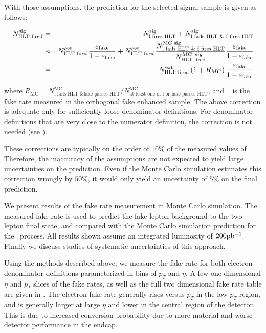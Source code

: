 \documentclass{cmspaper}
\begin{document}
With those assumptions, the prediction for the selected signal sample is given as follows:

\begin{eqnarray}
  N^{\textrm{sig}}_{\textrm{HLT fired}} & = & N^{\textrm{sig}}_{\textrm{l fires HLT}} + N^{\textrm{sig}}_{\textrm{l fails HLT \& f fires HLT}} \nonumber \\
  & \approx &  N^{\textrm{ext}}_{\textrm{HLT fired}} \frac{\varepsilon_{\mathrm{fake}}}{1-\varepsilon_{\mathrm{fake}}} +  N^{\textrm{ext}}_{\textrm{HLT fired}} \frac{N^{\textrm{MC\ sig}}_{\textrm{l fails HLT \& f fires HLT}}}{N^{MC\ sig}_{\textrm{HLT fired}}} \frac{\varepsilon_{\mathrm{fake}}}{1-\varepsilon_{\mathrm{fake}}} \nonumber \\
  & = &  N^{\textrm{ext}}_{\textrm{HLT fired}} \left(1+R_{MC}\right) \frac{\varepsilon_{\mathrm{fake}}}{1-\varepsilon_{\mathrm{fake}}} \nonumber \\
\end{eqnarray}

where $R_{\textrm{MC}} = N^{\textrm{MC}}_{\textrm{l fails HLT \& fake passes HLT}} / N^{\textrm{MC}}_{\textrm{at least one of l or fake passes HLT}}$, and \epsilonFake~ is the fake rate measured in the orthogonal fake enhanced sample. The above correction is adequate only for sufficiently loose denominator definitions. For denominator definitions that are very close to the numerator definition, the correction is not needed (see ).

These corrections are typically on the order of $10\%$ of the measured values of \epsilonFake. Therefore, the inaccuracy of the assumptions are not expected to yield large uncertainties on the prediction. Even if the Monte Carlo simulation estimates this correction wrongly by $50\%$, it would only yield an uncertainty of $5\%$ on the final prediction.

We present results of the fake rate measurement in Monte Carlo simulation. The measured fake rate is used to predict the fake lepton background to the two lepton final state, and compared with the Monte Carlo simulation prediction for the \WPlusJets\ process. All results shown assume an integrated luminosity of $200\mathrm{pb^{-1}}$. Finally we discuss studies of systematic uncertainties of this approach. 


\label{sec:electronfakerates}
Using the methods described above, we measure the fake rate for both electron denominator definitions parameterized in bins of $p_T$ and $\eta$. A few one-dimensional $\eta$ and $p_T$ slices of the fake rates, as well as the full two dimensional fake rate table are given in . The electron fake rate generally rises versus $p_T$ in the low $p_T$ region, and is generally larger at large $\eta$ and lower in the central region of the detector. This is due to increased conversion probability due to more material and worse detector performance in the endcap.
\end{document}
